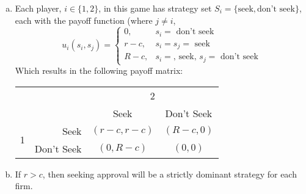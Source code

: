 \documentclass{article}
\begin{document}
\begin{enumerate}[(a)]
	\item Each player, $i\in\{1,2\}$, in this game has strategy set $S_i=\{\text{seek},\text{don't seek}\}$, each with the payoff function (where $j\neq i$,
		\[
			u_i(s_i,s_j) = 
				\begin{cases} 
					0, 		& s_i = \text{ don't seek} \\ 
					r - c, 	& s_i = s_j = \text{ seek} \\ 
					R - c, 	& s_i = \text{, seek, } s_j = \text{ don't seek} 
				\end{cases}
		\]
		Which results in the following payoff matrix:
		\begin{center}
			\begin{tabular}{crcc}
			&					& \multicolumn{2}{c}{2}													\\
			&					& Seek								& Don't Seek						\\ \cline{3-4} 
			\multirow{2}{*}{1}						
			& Seek				& \multicolumn{1}{|c|}{$(r-c,r-c)$}	& \multicolumn{1}{|c|}{$(R-c,0)$}	\\ \cline{3-4}
			& Don't Seek		& \multicolumn{1}{|c|}{$(0,R-c)$}	& \multicolumn{1}{|c|}{$(0,0)$}		\\ \cline{3-4}
			
			\end{tabular}
		\end{center}
		
	\item If $r>c$, then seeking approval will be a strictly dominant strategy for each firm.
\end{enumerate}


\end{document}
